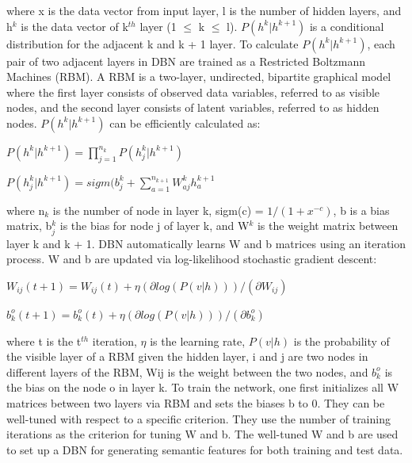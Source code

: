 \documentclass{article}
\begin{document}
where x is the data vector from input layer, l is the number of hidden layers, and h$^k$ is the data vector of k$^{th}$ layer (1 $\leq$ k $\leq$ l). $P(h^k|h^{k+1})$ is a conditional distribution for the adjacent k and k + 1 layer. To calculate $P(h^k|h^{k+1})$, each pair of two adjacent layers in DBN are trained as a Restricted Boltzmann Machines (RBM). A RBM is a two-layer, undirected, bipartite graphical model where the first layer consists of observed data variables, referred to as visible nodes, and the second layer consists of latent variables, referred to as hidden nodes. $P(h^k|h^{k+1})$ can be efficiently calculated as:

\begin{math}
P(h^k|h^{k+1}) = \prod_{j=1}^{n_k} P(h^k_j|h^{k+1})
\end{math}

\begin{math}
P(h^k_j|h^{k+1}) = sigm(b_j^k + \sum_{a=1}^{n_{k+1}} W^k_{aj}h^{k+1}_a
\end{math} 

where n$_k$ is the number of node in layer k, sigm(c) = $1/(1+x^{-c})$, b is a bias matrix, b$^k_j$ is the bias for node j of layer k, and W$^k$ is the weight matrix between layer k and k + 1.
DBN automatically learns W and b matrices using an iteration process. W and b are updated via log-likelihood stochastic gradient descent:

\begin{math}
W_{ij}(t+1) = W_{ij}(t) + \eta(\partial log(P(v|h)))/(\partial W_{ij})
\end{math}

\begin{math}
b_k^o(t+1) = b_k^o(t) + \eta(\partial log(P(v|h)))/(\partial b_k^o)
\end{math}

where t is the t$^{th}$ iteration, $\eta$ is the learning rate, $P(v|h)$ is the probability of the visible layer of a RBM given the hidden layer, i and j are two nodes in different layers of the RBM, Wij is the weight between the two nodes, and $b_k^o$ is the bias on the node o in layer k. To train the network, one first initializes all W matrices between two layers via RBM and sets the biases b to 0. They can be well-tuned with respect to a specific criterion. They use the number of training iterations as the criterion for tuning W and b. The well-tuned W and b are used to set up a DBN for generating semantic features for both training and test data.
\end{document}
